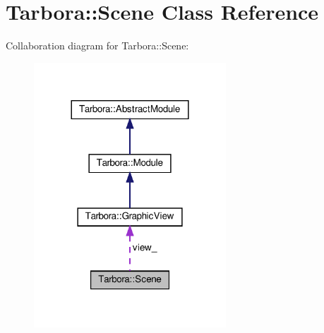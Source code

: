 \hypertarget{classTarbora_1_1Scene}{}\section{Tarbora\+:\+:Scene Class Reference}
\label{classTarbora_1_1Scene}


Collaboration diagram for Tarbora\+:\+:Scene\+:\nopagebreak
\begin{figure}[H]
\begin{center}
\leavevmode
\includegraphics[width=204pt]{classTarbora_1_1Scene__coll__graph}
\end{center}
\end{figure}
